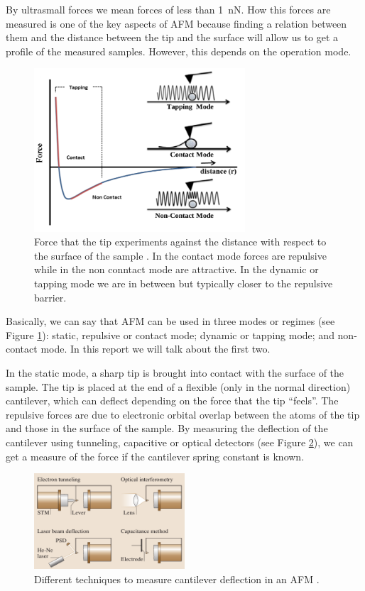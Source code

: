 \documentclass[11pt,a4paper]{article}
\begin{document}
By ultrasmall forces we mean forces of less than \SI{1}{\nano\N}. How this forces are measured is one of the key aspects of AFM because finding a relation between them and the distance between the tip and the surface will allow us to get a profile of the measured samples. However, this depends on the operation mode.

\begin{figure}[ht]
\centering
\includegraphics[width=0.7\textwidth]{AFM_modes}
\caption{Force that the tip experiments against the distance with respect to the surface of the sample \cite{jfb8010007}. In the contact mode forces are repulsive while in the non conntact mode are attractive. In the dynamic or tapping mode we are in between but typically closer to the repulsive barrier.}
\label{fig:AFM_modes}
\end{figure}

{\color{red}Basically, we can say that AFM can be used in three modes or regimes} (see Figure \ref{fig:AFM_modes}): static, repulsive or contact mode; dynamic or tapping mode; and non-contact mode. In this report we will talk about the first two.

In the static mode, a sharp tip is brought into contact with the surface of the sample. The tip is placed at the end of a flexible (only in the normal direction) cantilever, which can deflect depending on the force that the tip ``feels''. The repulsive forces are due to electronic orbital overlap between the atoms of the tip and those in the surface of the sample. By measuring the deflection of the cantilever using tunneling, capacitive or optical detectors (see Figure \ref{fig:Deflection_measurement}), we can get a measure of the force if the cantilever spring constant is known.

\begin{figure}[ht]
\centering
\includegraphics[width=0.5\textwidth]{Deflection}
\caption{Different techniques to measure cantilever deflection in an AFM \cite{Bhushan}.}
\label{fig:Deflection_measurement}
\end{figure}
\end{document}
